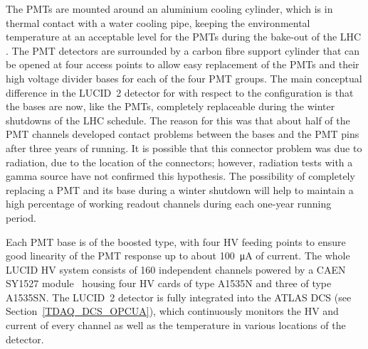 \documentclass[cernpreprint, atlasdraft=false, UKenglish,british,orcidlogo, texmf, orcidlogo]{atlasdoc}
\begin{document}
The \glspl{PMT} are mounted around an aluminium cooling cylinder, which is in thermal contact with a water cooling pipe, keeping the environmental temperature at an acceptable level for the \glspl{PMT} during the bake-out of the \gls{LHC} \beampipe. The \gls{PMT} detectors are surrounded by a carbon fibre support cylinder that can be opened at four access points to allow easy replacement of the \glspl{PMT} and their high voltage divider bases for each of the four \gls{PMT} groups.
The main conceptual difference in the \gls{LUCID}~2 detector for \RunThr with respect to the \RunTwo configuration is that the bases are now, like the \glspl{PMT}, completely replaceable during the winter shutdowns of the \gls{LHC} schedule.
The reason for this was that about half of the \gls{PMT} channels developed contact problems between the bases and the \gls{PMT} pins after three years of running.
It is possible that this connector problem was due to radiation, due to the location of the connectors;
however, radiation tests with a gamma source have not confirmed this hypothesis.
The possibility of completely replacing a \gls{PMT} and its base during a winter shutdown will help to maintain a high percentage of working readout channels during each one-year running period.
 
Each \gls{PMT} base is of the boosted type, with four \gls{HV} feeding points to ensure good linearity of the \gls{PMT} response up to about \SI{100}{\micro\ampere} of current. The whole \gls{LUCID} \gls{HV} system consists of 160 independent channels powered by a CAEN SY1527 module~\cite{caen_sy1527} housing
four \gls{HV} cards of type A1535N and three of type A1535SN.
The \gls{LUCID}~2 detector is fully integrated into the ATLAS \gls{DCS} (see Section~\ref{TDAQ_DCS_OPCUA}), which continuously monitors the \gls{HV} and current of every channel as
well as the temperature in various locations of the detector.
\end{document}
